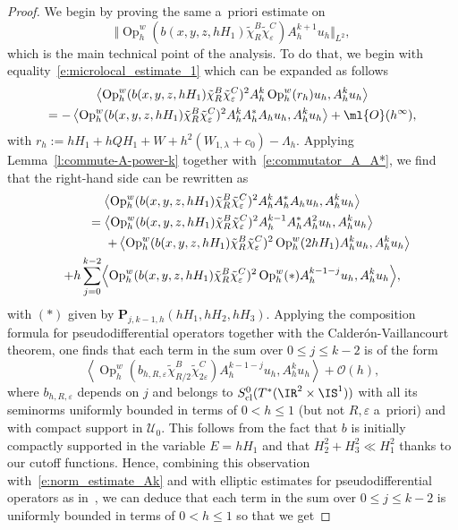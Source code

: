 \documentclass[JEP,XML,SOM,Unicode, NoEqCountersInSection,published]{cedram}
\theoremstyle{plain}
\theoremstyle{definition}
\theoremstyle{remark}
\newcommand{\Op}{\operatorname{Op}}
\begin{document}
\begin{proof}
We begin by proving the same a~priori estimate on
\[
\Vert \Op_h^w(b(x,y,z,hH_1)\tilde{\chi}_R^B\tilde{\chi}_\varepsilon^C)A^{k+1}_h u_h \Vert_{L^2},
\]
which is the main technical point of the analysis. To do that, we begin with equality~\eqref{e:microlocal_estimate_1} which can be expanded as follows
\begin{multline*}
\left\langle \Op_h^w(b(x,y,z,hH_1)\tilde{\chi}_R^B\tilde{\chi}_\varepsilon^C)^2A_h^k\Op_h^w(r_h)u_h,A_h^ku_h\right\rangle \\ =-\left\langle \Op_h^w(b(x,y,z,hH_1)\tilde{\chi}_R^B\tilde{\chi}_\varepsilon^C)^2A_h^kA_h^*A_h u_h,A_h^ku_h\right\rangle
+ \ml{O}(h^\infty),
\end{multline*}
with $r_h:=hH_1+hQH_1+W+h^2(W_{1,\lambda}+c_0)-\Lambda_h$. Applying Lemma~\ref{l:commute-A-power-k} together with~\eqref{e:commutator_A_A*}, we find that the right-hand side can be rewritten as
\begin{multline*}
\left\langle \Op_h^w(b(x,y,z,hH_1)\tilde{\chi}_R^B\tilde{\chi}_\varepsilon^C)^2A_h^kA_h^*A_h u_h,A_h^ku_h\right\rangle \\
=\left\langle \Op_h^w(b(x,y,z,hH_1)\tilde{\chi}_R^B\tilde{\chi}_\varepsilon^C)^2A_h^{k-1}A_h^*A_h^2 u_h,A_h^ku_h\right\rangle\\ \hspace*{1.5cm}+\left\langle \Op_h^w(b(x,y,z,hH_1)\tilde{\chi}_R^B\tilde{\chi}_\varepsilon^C)^2\Op_h^w(2hH_1)A_h ^ku_h,A_h^ku_h\right\rangle\\ +h\sum_{j=0}^{k-2}\Bigl\langle \Op_h^w(b(x,y,z,hH_1)\tilde{\chi}_R^B\tilde{\chi}_\varepsilon^C)^2\Op_{h}^w(*)A_h^{k-1-j} u_h,A_h^ku_h\Bigr\rangle,
\end{multline*}
with $(*)$ given by $\boldsymbol{P}_{j,k-1,h}(hH_1,hH_2,hH_3).$ Applying the composition formula for pseudodifferential operators together with the Cal\-de\-rón-Vaillancourt theorem, one finds that each term in the sum over $0\leq j\leq k-2$ is of the form
\[
\left\langle \Op_h^w(b_{h,R,\varepsilon}\tilde{\chi}_{R/2}^B\tilde{\chi}_{2\varepsilon}^C)A_h^{k-1-j} u_h,A_h^ku_h\right\rangle+\mathcal{O}(h),
\]
where $b_{h,R,\varepsilon}$ depends on $j$ and belongs to $S^0_{\textup{cl}}(T^*(\IR^2\times \IS^1))$ with all its seminorms uniformly bounded in terms of $0<h\leq 1$ (but not $R,\varepsilon$ a~priori) and with compact support in $\mathcal{U}_0$. This follows from the fact that $b$ is initially compactly supported in the variable $E=hH_1$ and that $H_2^2+H_3^2\ll H_1^2$ thanks to our cutoff functions. Hence, combining this observation with~\eqref{e:norm_estimate_Ak} and with elliptic estimates for pseudodifferential operators as in~\cite[Th.\,E.33]{DyatlovZworski19}, we can deduce that each term in the sum over $0\leq j\leq k-2$ is uniformly bounded in terms of $0<h\leq 1$ so that we get

\end{proof}
\end{document}
